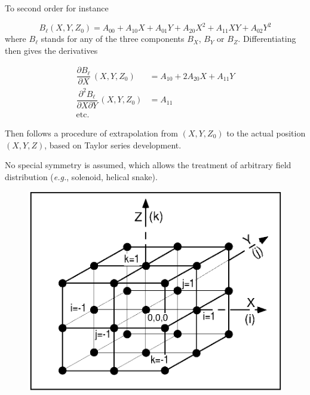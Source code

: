 \noindent To second order for instance 

 \begin{equation}
	 B_{\ell} (X,Y,Z_0)=A_{00} +A_{10} X +A_{01} Y +A_{20} X^2 +A_{11} X Y +A_{02} Y^2
 	\label{eq2-4-10}
 \end{equation}
where $ B_{\ell} $ stands for any of the three components $ B_X$, 
$B_Y $ or $ B_Z $. 
Differentiating then gives the derivatives

\begin{equation}
	\begin{aligned}
		 \dfrac{ \partial B_{\ell} }{ \partial X} \,(X,Y,Z_0)
		     & =   A_{10} +2 A_{20} X + A_{11} Y  \\
		\dfrac{ \partial^2 B_{\ell} }{ \partial X\partial Y}\, (X,Y,Z_0)
		     & =  A_{11} \\
		\text{etc.}
	\end{aligned}
	\label{eq2-4-11}
\end{equation}


\noindent Then follows a procedure of extrapolation from $ (X,Y,Z_0) $ to
the actual position $ (X,Y,Z)$, based on Taylor series development. 

\noindent No special symmetry is assumed, which allows the treatment of 
arbitrary field distribution (\emph{e.g.}, solenoid, helical snake). 


\begin{figure}[h]   %
\centerline{\includegraphics[width=14cm]{Fig4.ps}}
\end{figure}




